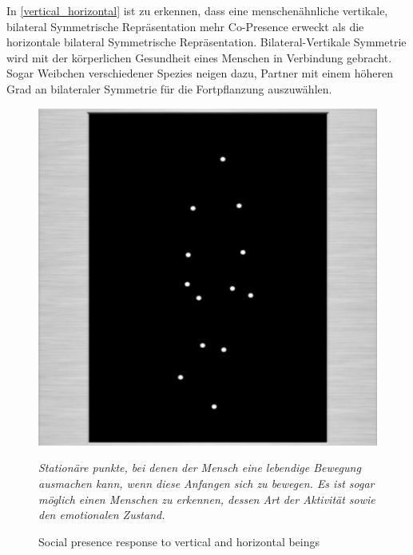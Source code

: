 \documentclass[a4paper,11pt]{article}%
\renewcommand{\\}{\vspace*{0.5\baselineskip} \newline}
\begin{document}
In \autoref{vertical_horizontal} ist zu erkennen, dass eine menschenähnliche vertikale, bilateral Symmetrische Repräsentation mehr \dq{}Co-Presence\dq{} erweckt als die horizontale bilateral Symmetrische Repräsentation. \citep[p.546-551]{thornhill1998relative}
Bilateral-Vertikale Symmetrie wird mit der körperlichen Gesundheit eines Menschen in Verbindung gebracht. Sogar Weibchen verschiedener Spezies neigen dazu, Partner mit einem höheren Grad an bilateraler Symmetrie für die Fortpflanzung auszuwählen. \citep[p. 659–669]{rhodes1998facial} \citep{biocca2002defining} \citep[p.233–242]{grammer1994human} \ \\

\begin{figure}[H]
		\begin{footnotesize}
		\centering
			\includegraphics[scale= 0.5]{Abbildungen/moving_dots.JPG}
			\caption[Abbildung 1]{Social presence response to vertical and
horizontal beings}
			\textit{Stationäre punkte, bei denen der Mensch eine lebendige Bewegung ausmachen kann, wenn diese Anfangen sich zu bewegen. Es ist sogar möglich einen Menschen zu erkennen, dessen Art der Aktivität sowie den emotionalen Zustand. \citep{biocca2002defining} \citep[p.76-89]{johansson1975visual}}

			\label{moving_dots}
		\end{footnotesize}
	\end{figure}
\end{document}
